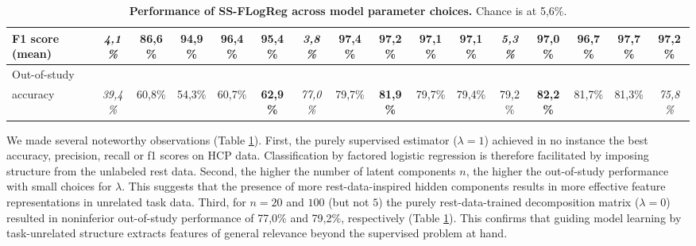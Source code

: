 \documentclass{article} %
\begin{document}
\begin{table}[h]
{\begin{tabular}{l|ccccc|ccccc|ccccc}
  F1 score (mean)           & \textit{4,1\%}                     & 86,6\%                             & 94,9\%                            & \textbf{96,4\%}                    & 95,4\%                           & \textit{3,8\%}                   & \textbf{97,4\%}                      & 97,2\%                              & 97,1\%                               & 97,1\%                             & \textit{5,3\%}   & 97,0\%           & 96,7\%           & \textbf{97,7\%}  & 97,2\%                             \\ \hline
  Out-of-study\\accuracy    & \textit{39,4\%}                    & 60,8\%                             & 54,3\%                            & 60,7\%                             & \textbf{62,9\%}                  & \textit{77,0\%}                  & 79,7\%                               & \textbf{81,9\%}                     & 79,7\%                               & 79,4\%                             & 79,2\%           & \textbf{82,2\%}  & 81,7\%           & 81,3\%           & \textit{75,8\%}                    \\ \hline
  \end{tabular}
}
\vspace{-0.2cm}
 \caption{\textbf{Performance of SS-FLogReg across model parameter choices.}
 Chance is at 5,6\%.
 }
  \label{table_two}
\end{table}

We made several noteworthy observations (Table \ref{table_two}).
%
First, the purely supervised estimator ($\lambda=1$) achieved in no
instance the best accuracy, precision, recall or f1 scores on HCP data.
Classification by factored logistic regression is therefore facilitated by
imposing structure from the unlabeled rest data.
%
Second, the higher the number of latent components $n$,
the higher the out-of-study performance with small choices for $\lambda$.
This suggests that the presence of more rest-data-inspired hidden components
results in more effective feature representations in unrelated task data.
%
Third, for $n=20$ and $100$ (but not $5$) the purely rest-data-trained
decomposition matrix ($\lambda=0$) resulted in
noninferior out-of-study performance
of 77,0\% and 79,2\%,
respectively (Table \ref{table_two}).
This confirms that guiding model learning by task-unrelated structure
extracts features of general relevance
beyond the supervised problem at hand.

\end{document}

